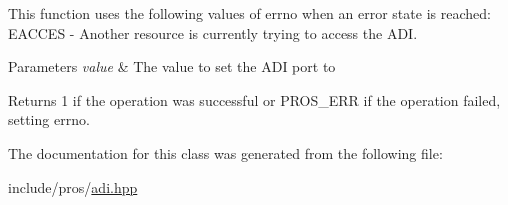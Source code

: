 This function uses the following values of errno when an error state is reached\+: E\+A\+C\+C\+ES -\/ Another resource is currently trying to access the A\+DI.


\begin{DoxyParams}{Parameters}
{\em value} & The value to set the A\+DI port to\\
\hline
\end{DoxyParams}
\begin{DoxyReturn}{Returns}
1 if the operation was successful or P\+R\+O\+S\+\_\+\+E\+RR if the operation failed, setting errno. 
\end{DoxyReturn}


The documentation for this class was generated from the following file\+:\begin{DoxyCompactItemize}
\item 
include/pros/\mbox{\hyperlink{adi_8hpp}{adi.\+hpp}}\end{DoxyCompactItemize}
